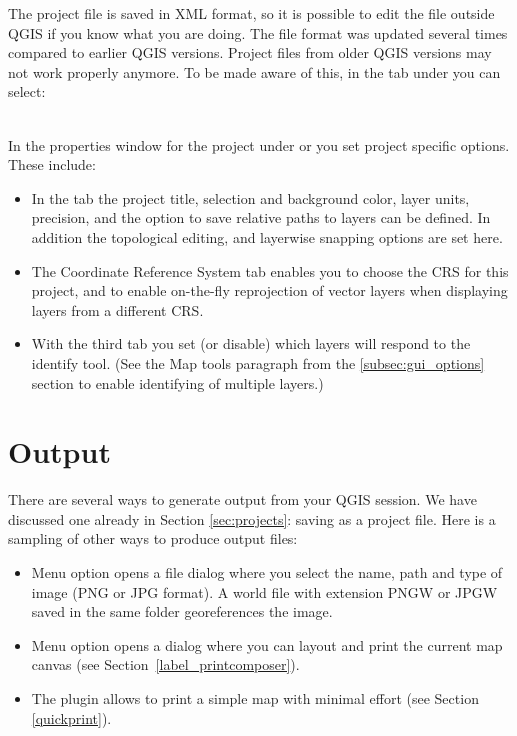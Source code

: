 The project file is saved in XML format, so it is possible to edit
the file outside QGIS if you know what you are doing. The file format
was updated several times compared to earlier QGIS versions. Project files
from older QGIS versions may not work properly anymore. To be made aware of this,
in the  tab under  \arrow {}
you can select: \\

 \\

In the properties window for the project under  or  you set project specific options. These
include:

\begin{itemize}
\item In the  tab the project title, selection and background
color, layer units, precision, and the option to save relative paths to
layers can be defined. In addition the topological editing, and layerwise
snapping options are set here.
\item The  Coordinate Reference System tab enables you to choose the
CRS for this project, and to enable on-the-fly reprojection of vector layers
when displaying layers from a different CRS.
\item With the third  tab you set (or disable) which
layers will respond to the identify tool. (See the Map tools paragraph from
the \ref{subsec:gui_options} section to enable identifying of multiple layers.)
\end{itemize}

\section{Output}\label{sec:output}

There are several ways to generate output from your QGIS session. We have
discussed one already in Section \ref{sec:projects}: saving as a project file.
Here is a sampling of other ways to produce output files:

\begin{itemize}
\item Menu option  opens
a file dialog where you select the name, path and type of image (PNG or JPG
format). A world file with extension PNGW or JPGW saved in the same folder
georeferences the image.
\item Menu option  opens a
dialog where you can layout and print the current map canvas (see
Section~\ref{label_printcomposer}).
\item The  plugin allows
to print a simple map with minimal effort (see Section \ref{quickprint}).
\end{itemize}

